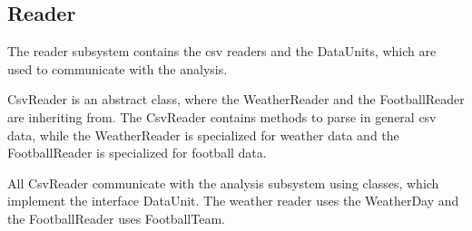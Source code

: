 \documentclass{article}
\begin{document}
	\subsection*{Reader}
	
	The reader subsystem contains the csv readers and the DataUnits, which are used to communicate with the analysis.
	
	CsvReader is an abstract class, where the WeatherReader and the FootballReader are inheriting from. The CsvReader contains methods to parse in general csv data, while the WeatherReader is specialized for weather data and the FootballReader is specialized for football data. 
	
	All CsvReader communicate with the analysis subsystem using classes, which implement the interface DataUnit. The weather reader uses the WeatherDay and the FootballReader uses FootballTeam.
	
\end{document}
